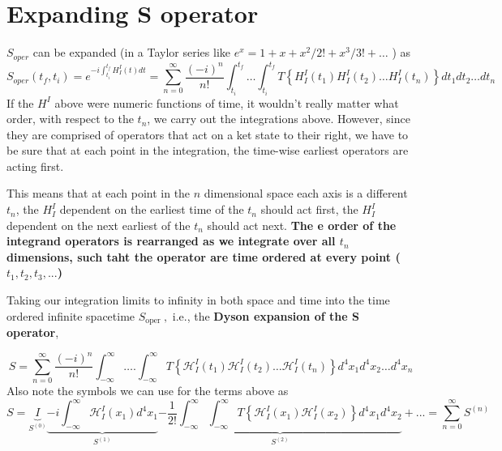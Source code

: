 \section{Expanding S operator}
$S_{oper}$ can be expanded (in a Taylor series like $e^{x}=1+x+x^{2} / 2 !+x^{3} / 3 !+\ldots$ ) as
$$
S_{o p e r}\left(t_{f}, t_{i}\right)=e^{-i \int_{t_{i}}^{t_{f}} H_{I}^{I}(t) d t}=\sum_{n=0}^{\infty} \frac{(-i)^{n}}{n !} \int_{t_{i}}^{t_{f}} \dots \int_{t_{i}}^{t_{f}} T\left\{H_{I}^{I}\left(t_{1}\right) H_{I}^{I}\left(t_{2}\right) \dots H_{I}^{I}\left(t_{n}\right)\right\} d t_{1} d t_{2} \dots d t_{n}
$$
If the $H^{I}$ above were numeric functions of time, it wouldn't really matter what order, with respect to the $t_{n}$, we carry out the integrations above. However, since they are comprised of operators that act on a ket state to their right, we have to be sure that at each point in the integration, the time-wise earliest operators are acting first.

This means that at each point in the $n$ dimensional space each axis is a different $t_{n}$, the $H_{I}^{I}$ dependent on the earliest time of the $t_{n}$ should act first, the $H_{I}^{I}$ dependent on the next earliest of the $t_{n}$ should act next. \textbf{The e order of the integrand operators is rearranged as we integrate over all $t_n$ dimensions, such taht the operator are time ordered at every point ($t_1,t_2,t_3,...$)}

Taking our integration limits to infinity in both space and time into the time ordered infinite spacetime $S_{\text {oper }},$ i.e., the \textbf{Dyson expansion of the S operator},
\begin{qt}
\begin{equation}
S=\sum_{n=0}^{\infty} \frac{(-i)^{n}}{n !} \int_{-\infty}^{\infty} \ldots . \int_{-\infty}^{\infty} T\left\{\mathcal{H}_{I}^{I}\left(t_{1}\right) \mathcal{H}_{I}^{I}\left(t_{2}\right) \ldots \mathcal{H}_{I}^{I}\left(t_{n}\right)\right\} d^{4} x_{1} d^{4} x_{2} \ldots d^{4} x_{n}
\end{equation}
Also note the symbols we can use for the terms above as
$$
S=\underbrace{I}_{S^{(0)}}\underbrace{-i \int_{-\infty}^{\infty} \mathcal{H}_{I}^{I}\left(x_{1}\right) d^{4} x_{1}}_{S^{(1)}}\underbrace{-\frac{1}{2!} \int_{-\infty}^{\infty} \int_{-\infty}^{\infty} T\left\{\mathcal{H}_{I}^{I}\left(x_{1}\right) \mathcal{H}_{I}^{I}\left(x_{2}\right)\right\} d^{4} x_{1} d^{4} x_{2}}_{S^{(2)}}+...=\sum_{n=0}^{\infty} S^{(n)}
$$
\end{qt}
